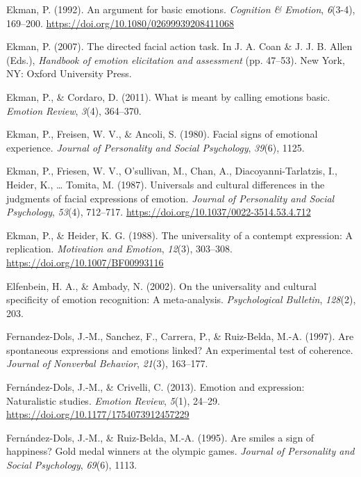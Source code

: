 \documentclass[man]{apa6}
\begin{document}
\leavevmode\hypertarget{ref-ekman1992argument}{}%
Ekman, P. (1992). An argument for basic emotions. \emph{Cognition \& Emotion}, \emph{6}(3-4), 169--200. \url{https://doi.org/10.1080/02699939208411068}

\leavevmode\hypertarget{ref-ekman2007directed}{}%
Ekman, P. (2007). The directed facial action task. In J. A. Coan \& J. J. B. Allen (Eds.), \emph{Handbook of emotion elicitation and assessment} (pp. 47--53). New York, NY: Oxford University Press.

\leavevmode\hypertarget{ref-ekman2011meant}{}%
Ekman, P., \& Cordaro, D. (2011). What is meant by calling emotions basic. \emph{Emotion Review}, \emph{3}(4), 364--370.

\leavevmode\hypertarget{ref-ekman1980facial}{}%
Ekman, P., Freisen, W. V., \& Ancoli, S. (1980). Facial signs of emotional experience. \emph{Journal of Personality and Social Psychology}, \emph{39}(6), 1125.

\leavevmode\hypertarget{ref-ekman1987universals}{}%
Ekman, P., Friesen, W. V., O'sullivan, M., Chan, A., Diacoyanni-Tarlatzis, I., Heider, K., \ldots{} Tomita, M. (1987). Universals and cultural differences in the judgments of facial expressions of emotion. \emph{Journal of Personality and Social Psychology}, \emph{53}(4), 712--717. \url{https://doi.org/10.1037/0022-3514.53.4.712}

\leavevmode\hypertarget{ref-ekman1988universality}{}%
Ekman, P., \& Heider, K. G. (1988). The universality of a contempt expression: A replication. \emph{Motivation and Emotion}, \emph{12}(3), 303--308. \url{https://doi.org/10.1007/BF00993116}

\leavevmode\hypertarget{ref-elfenbein2002universality}{}%
Elfenbein, H. A., \& Ambady, N. (2002). On the universality and cultural specificity of emotion recognition: A meta-analysis. \emph{Psychological Bulletin}, \emph{128}(2), 203.

\leavevmode\hypertarget{ref-fernandez1997spontaneous}{}%
Fernandez-Dols, J.-M., Sanchez, F., Carrera, P., \& Ruiz-Belda, M.-A. (1997). Are spontaneous expressions and emotions linked? An experimental test of coherence. \emph{Journal of Nonverbal Behavior}, \emph{21}(3), 163--177.

\leavevmode\hypertarget{ref-fernandez2013emotion}{}%
Fernández-Dols, J.-M., \& Crivelli, C. (2013). Emotion and expression: Naturalistic studies. \emph{Emotion Review}, \emph{5}(1), 24--29. \url{https://doi.org/10.1177/1754073912457229}

\leavevmode\hypertarget{ref-fernandez1995smiles}{}%
Fernández-Dols, J.-M., \& Ruiz-Belda, M.-A. (1995). Are smiles a sign of happiness? Gold medal winners at the olympic games. \emph{Journal of Personality and Social Psychology}, \emph{69}(6), 1113.
\end{document}
